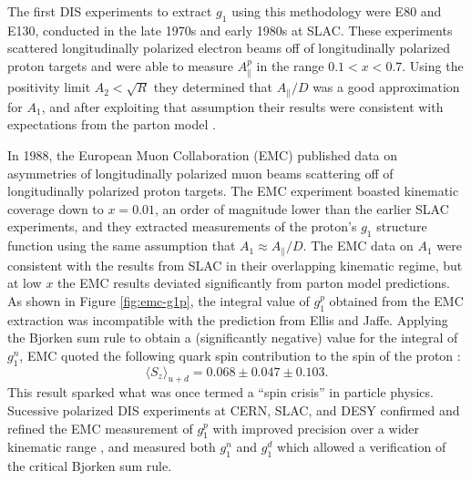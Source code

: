 The first DIS experiments to extract $g_1$ using this methodology were E80 and E130, conducted in the late 1970s and early 1980s at SLAC.  These experiments scattered longitudinally polarized electron beams off of longitudinally polarized proton targets and were able to measure $A_{\parallel}^p$ in the range $0.1 < x < 0.7$.  Using the positivity limit $A_2 < \sqrt{R}$ they determined that $A_{\parallel}/D$ was a good approximation for $A_1$, and after exploiting that assumption their results were consistent with expectations from the parton model \cite{Alguard:1976bm, Baum:1983ha}. %

In 1988, the European Muon Collaboration (EMC) published data on asymmetries of longitudinally polarized muon beams scattering off of longitudinally polarized proton targets.  The EMC experiment boasted kinematic coverage down to $x = 0.01$, an order of magnitude lower than the earlier SLAC experiments, and they extracted measurements of the proton's $g_1$ structure function using the same assumption that $A_1 \approx A_{\parallel}/D$. The EMC data on $A_1$ were consistent with the results from SLAC in their overlapping kinematic regime, but at low $x$ the EMC results deviated significantly from parton model predictions. As shown in Figure \ref{fig:emc-g1p}, the integral value of $g_1^p$ obtained from the EMC extraction was incompatible with the prediction from Ellis and Jaffe.  Applying the Bjorken sum rule to obtain a (significantly negative) value for the integral of $g_1^n$, EMC quoted the following quark spin contribution to the spin of the proton \cite{Ashman:1987hv}: %
%
\begin{equation}
  \langle S_z \rangle_{u+d} = 0.068 \pm 0.047 \pm 0.103.
\end{equation}
%
This result sparked what was once termed a ``spin crisis'' in particle physics.  Sucessive polarized DIS experiments at CERN, SLAC, and DESY confirmed and refined the EMC measurement of $g_1^p$ with improved precision over a wider kinematic range \cite{Adams:1994zd}, and measured both $g_1^n$ \cite{Anthony:1993uf} and $g_1^d$ \cite{Adeva:1993km} which allowed a verification of the critical Bjorken sum rule.

